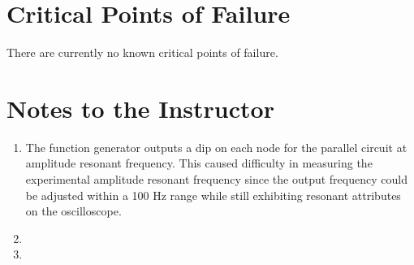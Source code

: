 \section{Critical Points of Failure}

There are currently no known critical points of failure.

\section{Notes to the Instructor}
\begin{enumerate}
\item The function generator outputs a dip on each node for the parallel circuit at amplitude resonant frequency. This caused difficulty in measuring the experimental amplitude resonant frequency since the output frequency could be adjusted within a 100 Hz range while still exhibiting resonant attributes on the oscilloscope. 
\item 
\item 
\end{enumerate}

